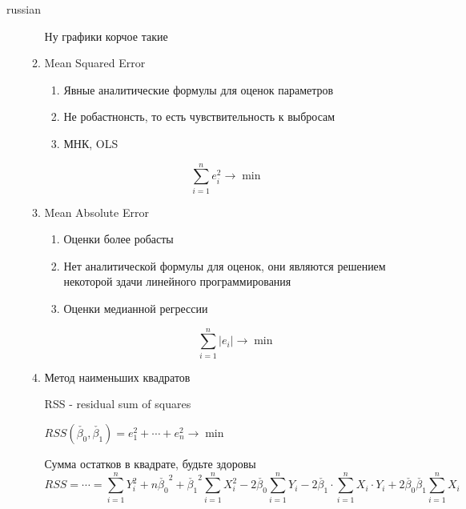 \documentclass{article}
\begin{document}
\begin{otherlanguage*}{russian}
\begin{enumerate}
\begin{enumerate}


Ну графики корчое такие 


\item Mean Squared Error

\begin{enumerate}
\item Явные аналитические формулы для оценок параметров
\item Не робастнонсть, то есть чувствительность к выбросам
\item МНК, OLS
\end{enumerate}
\begin{equation}
\sum_{i=1}^n e^2_i \rightarrow \min
\end{equation}

\item Mean Absolute Error

\begin{enumerate}
\item Оценки более робасты
\item Нет аналитической формулы для оценок, они являются решением некоторой здачи линейного программирования
\item Оценки медианной регрессии

\begin{equation}
\sum_{i=1}^n |e_i| \rightarrow \min 
\end{equation}
\end{enumerate}
\item Метод наименьших квадратов

RSS - residual sum of squares

$ RSS(\check{\beta_0}, \check{\beta_1}) = e_1^2 + \cdots + e^2_n \rightarrow \min$ 

Сумма остатков в квадрате, будьте здоровы
\begin{equation}
RSS = \cdots = \sum_{i=1}^n Y_i^2 + n \check{\beta_0}^2 + \check{\beta_1}^2 \sum_{i=1}^n X_i^2 - 2 \check{\beta_0} \sum_{i=1}^n Y_i - 2 \check{\beta_1} \cdot \sum_{i=1}^n X_i\cdot Y_i + 2 \check{\beta_0} \check{\beta_1} \sum_{i=1}^n X_i 
\end{equation}


\end{enumerate}
\end{enumerate}
\end{otherlanguage*}
\end{document}
